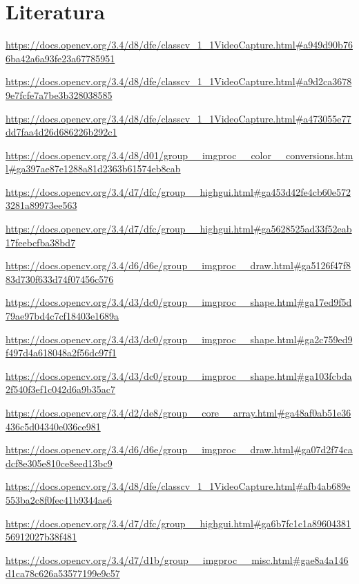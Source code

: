 \documentclass{article}
\begin{document}
\section{Literatura}
\label{Literatura}
\begin{thebibliography}{9}

\url{https://docs.opencv.org/3.4/d8/dfe/classcv_1_1VideoCapture.html#a949d90b766ba42a6a93fe23a67785951}

\url{https://docs.opencv.org/3.4/d8/dfe/classcv_1_1VideoCapture.html#a9d2ca36789e7fcfe7a7be3b328038585}

\url{https://docs.opencv.org/3.4/d8/dfe/classcv_1_1VideoCapture.html#a473055e77dd7faa4d26d686226b292c1}

\url{https://docs.opencv.org/3.4/d8/d01/group__imgproc__color__conversions.html#ga397ae87e1288a81d2363b61574eb8cab}

\url{https://docs.opencv.org/3.4/d7/dfc/group__highgui.html#ga453d42fe4cb60e5723281a89973ee563}

\url{https://docs.opencv.org/3.4/d7/dfc/group__highgui.html#ga5628525ad33f52eab17feebcfba38bd7}

\url{https://docs.opencv.org/3.4/d6/d6e/group__imgproc__draw.html#ga5126f47f883d730f633d74f07456c576}

\url{https://docs.opencv.org/3.4/d3/dc0/group__imgproc__shape.html#ga17ed9f5d79ae97bd4c7cf18403e1689a}

\url{https://docs.opencv.org/3.4/d3/dc0/group__imgproc__shape.html#ga2c759ed9f497d4a618048a2f56dc97f1}

\url{https://docs.opencv.org/3.4/d3/dc0/group__imgproc__shape.html#ga103fcbda2f540f3ef1c042d6a9b35ac7}

\url{https://docs.opencv.org/3.4/d2/de8/group__core__array.html#ga48af0ab51e36436c5d04340e036ce981}

\url{https://docs.opencv.org/3.4/d6/d6e/group__imgproc__draw.html#ga07d2f74cadcf8e305e810ce8eed13bc9}

\url{https://docs.opencv.org/3.4/d8/dfe/classcv_1_1VideoCapture.html#afb4ab689e553ba2c8f0fec41b9344ae6}

\url{https://docs.opencv.org/3.4/d7/dfc/group__highgui.html#ga6b7fc1c1a8960438156912027b38f481}

\url{https://docs.opencv.org/3.4/d7/d1b/group__imgproc__misc.html#gae8a4a146d1ca78c626a53577199e9c57}


\end{thebibliography}
\end{document}
